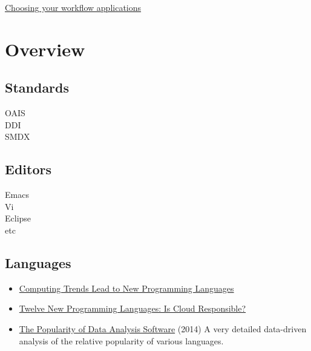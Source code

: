 \documentclass[reqno,12pt]{tufte-book}
\numberwithin{equation}{subsection}
\begin{document}
\href{http://kieranhealy.org/files/misc/workflow-apps.pdf}{Choosing your workflow applications}

\chapter{Overview}

\section{Standards}
\label{sect:standards}

\begin{description}
\item [OAIS]
\item [DDI]
\item [SMDX]
\end{description}

\section{Editors}
\label{sect:editors}

\begin{description}
\item [Emacs]
\item [Vi]
\item [Eclipse]
\item [etc]
\end{description}

\section{Languages}
\label{sect:langs}

\begin{itemize}
\item \href{http://ieeexplore.ieee.org/xpl/articleDetails.jsp?arnumber=6228573}{Computing Trends Lead to New Programming Languages}
\item \href{http://cloudcomputing.sys-con.com/node/2265359}{Twelve New Programming Languages: Is Cloud Responsible?}
\item \href{http://r4stats.com/articles/popularity/}{The Popularity of Data Analysis Software} (2014) A very detailed data-driven analysis of the relative popularity of various languages.
\end{itemize}
\end{document}
